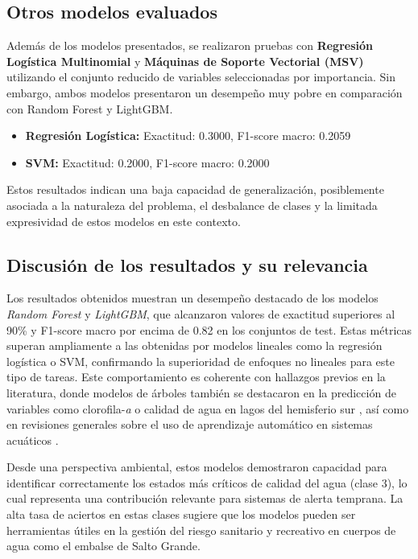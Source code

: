 \documentclass[
  11pt,
  pdftitle=TFI - Tschopp Joaquín S.,
  pdfauthor=Tschopp Joaquín S.,
  pdfcreator=LaTeX with hyperref,
]{report}  %
\begin{document}
\subsection{Otros modelos evaluados}

Además de los modelos presentados, se realizaron pruebas con \textbf{Regresión Logística Multinomial} y \textbf{Máquinas de Soporte Vectorial (MSV)} utilizando el conjunto reducido de variables seleccionadas por importancia. Sin embargo, ambos modelos presentaron un desempeño muy pobre en comparación con Random Forest y LightGBM.

\begin{itemize}[noitemsep]
  \item \textbf{Regresión Logística:} Exactitud: 0.3000, F1-score macro: 0.2059
  \item \textbf{SVM:} Exactitud: 0.2000, F1-score macro: 0.2000
\end{itemize}

Estos resultados indican una baja capacidad de generalización, posiblemente asociada a la naturaleza del problema, el desbalance de clases y la limitada expresividad de estos modelos en este contexto.


\subsection{Discusión de los resultados y su relevancia}

Los resultados obtenidos muestran un desempeño destacado de los modelos \textit{Random Forest} y \textit{LightGBM}, que alcanzaron valores de exactitud superiores al 90\% y F1-score macro por encima de 0.82 en los conjuntos de test. Estas métricas superan ampliamente a las obtenidas por modelos lineales como la regresión logística o SVM, confirmando la superioridad de enfoques no lineales para este tipo de tareas. Este comportamiento es coherente con hallazgos previos en la literatura, donde modelos de árboles también se destacaron en la predicción de variables como clorofila-\emph{a} o calidad de agua en lagos del hemisferio sur \citep{RodriguezLopez2023}, así como en revisiones generales sobre el uso de aprendizaje automático en sistemas acuáticos \citep{Schaeffer2024}.

Desde una perspectiva ambiental, estos modelos demostraron capacidad para identificar correctamente los estados más críticos de calidad del agua (clase 3), lo cual representa una contribución relevante para sistemas de alerta temprana. La alta tasa de aciertos en estas clases sugiere que los modelos pueden ser herramientas útiles en la gestión del riesgo sanitario y recreativo en cuerpos de agua como el embalse de Salto Grande.
\end{document}
